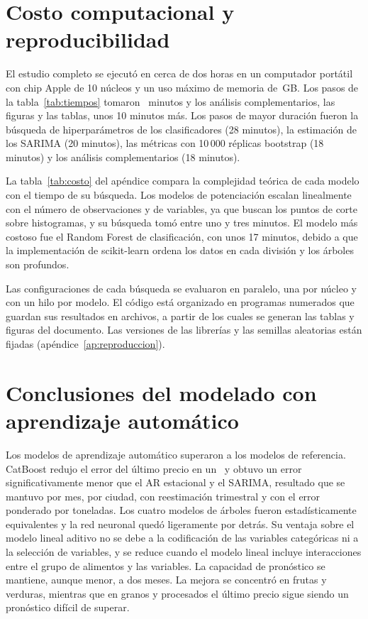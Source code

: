 \section{Costo computacional y reproducibilidad}
\label{sec:res_costo}

El estudio completo se ejecutó en cerca de dos horas en un computador portátil con chip Apple de 10 núcleos y un uso máximo de memoria de \cmemmax\,GB. Los pasos de la tabla~\ref{tab:tiempos} tomaron \ctiempototal\ minutos y los análisis complementarios, las figuras y las tablas, unos 10 minutos más. Los pasos de mayor duración fueron la búsqueda de hiperparámetros de los clasificadores (28 minutos), la estimación de los SARIMA (20 minutos), las métricas con 10\,000 réplicas bootstrap (18 minutos) y los análisis complementarios (18 minutos).

La tabla~\ref{tab:costo} del apéndice compara la complejidad teórica de cada modelo con el tiempo de su búsqueda. Los modelos de potenciación escalan linealmente con el número de observaciones y de variables, ya que buscan los puntos de corte sobre histogramas, y su búsqueda tomó entre uno y tres minutos. El modelo más costoso fue el Random Forest de clasificación, con unos 17 minutos, debido a que la implementación de scikit-learn ordena los datos en cada división y los árboles son profundos.

Las configuraciones de cada búsqueda se evaluaron en paralelo, una por núcleo y con un hilo por modelo. El código está organizado en programas numerados que guardan sus resultados en archivos, a partir de los cuales se generan las tablas y figuras del documento. Las versiones de las librerías y las semillas aleatorias están fijadas (apéndice~\ref{ap:reproduccion}).

\section{Conclusiones del modelado con aprendizaje automático}
\label{sec:conclusiones_ml}

Los modelos de aprendizaje automático superaron a los modelos de referencia. CatBoost redujo el error del último precio en un \cmeje\pct\ y obtuvo un error significativamente menor que el AR estacional y el SARIMA, resultado que se mantuvo por mes, por ciudad, con reestimación trimestral y con el error ponderado por toneladas. Los cuatro modelos de árboles fueron estadísticamente equivalentes y la red neuronal quedó ligeramente por detrás. Su ventaja sobre el modelo lineal aditivo no se debe a la codificación de las variables categóricas ni a la selección de variables, y se reduce cuando el modelo lineal incluye interacciones entre el grupo de alimentos y las variables. La capacidad de pronóstico se mantiene, aunque menor, a dos meses. La mejora se concentró en frutas y verduras, mientras que en granos y procesados el último precio sigue siendo un pronóstico difícil de superar.

